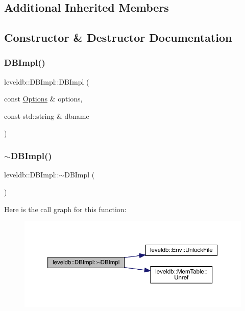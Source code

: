 \subsection*{Additional Inherited Members}


\subsection{Constructor \& Destructor Documentation}
\mbox{\label{classleveldb_1_1_d_b_impl_a269b55605b27271d6ca5fee68af0d8f3}} 
\subsubsection{\texorpdfstring{DBImpl()}{DBImpl()}}
{\footnotesize\ttfamily leveldb\+::\+D\+B\+Impl\+::\+D\+B\+Impl (\begin{DoxyParamCaption}\item[{const \mbox{\hyperlink{structleveldb_1_1_options}{Options}} \&}]{options,  }\item[{const std\+::string \&}]{dbname }\end{DoxyParamCaption})}

\mbox{\label{classleveldb_1_1_d_b_impl_a07a233a94a2531aed9d3718c9b9ed40d}} 
\subsubsection{\texorpdfstring{$\sim$DBImpl()}{~DBImpl()}}
{\footnotesize\ttfamily leveldb\+::\+D\+B\+Impl\+::$\sim$\+D\+B\+Impl (\begin{DoxyParamCaption}{ }\end{DoxyParamCaption})\hspace{0.3cm}{\ttfamily [virtual]}}

Here is the call graph for this function\+:
\nopagebreak
\begin{figure}[H]
\begin{center}
\leavevmode
\includegraphics[width=350pt]{classleveldb_1_1_d_b_impl_a07a233a94a2531aed9d3718c9b9ed40d_cgraph}
\end{center}
\end{figure}


